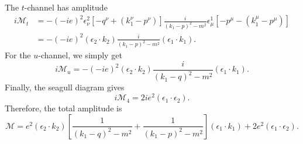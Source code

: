 \begin{solution}
    The $t$-channel has amplitude
    \begin{equation}
    \begin{aligned}
        i\mathcal{M}_t &= -(-ie)^2\epsilon_\nu^2[-q^\nu +(k_1^\nu-p^\nu)]\frac{i}{(k_1-p)^2-m^2}\epsilon_\mu^1[-p^\mu-(k_1^\mu-p^\mu)]\\
        &=-(-ie)^2(\epsilon_2\cdot k_2)\frac{i}{(k_1-p)^2-m^2}(\epsilon_1\cdot k_1).
    \end{aligned}
    \end{equation}
    For the $u$-channel, we simply get
    \begin{equation}
        i\mathcal{M}_u = -(-ie)^2(\epsilon_2\cdot k_2)\frac{i}{(k_1-q)^2-m^2}(\epsilon_1\cdot k_1).
    \end{equation}
    Finally, the seagull diagram gives
    \begin{equation}
        i\mathcal{M}_4 = 2ie^2(\epsilon_1\cdot\epsilon_2).
    \end{equation}
    Therefore, the total amplitude is 
    \begin{equation}
        \mathcal{M} = e^2(\epsilon_2\cdot k_2)\left[\frac{1}{(k_1-q)^2-m^2} + \frac{1}{(k_1-p)^2-m^2}\right](\epsilon_1\cdot k_1) +2e^2(\epsilon_1\cdot\epsilon_2).
    \end{equation}
\end{solution}